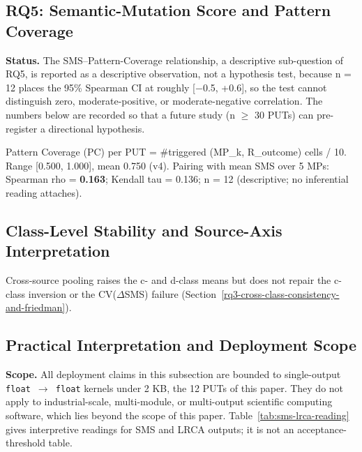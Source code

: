 \documentclass[manuscript,screen,review]{acmart}
\begin{document}
\subsection{RQ5: Semantic-Mutation Score and Pattern Coverage}\label{rq4-sms-vs-pattern-coverage}

\textbf{Status.} The SMS--Pattern-Coverage relationship, a descriptive
sub-question of RQ5, is reported as a descriptive observation, not a
hypothesis test, because n = 12 places the 95\% Spearman CI at roughly
{[}$-$0.5, +0.6{]}, so the test cannot distinguish zero,
moderate-positive, or moderate-negative correlation. The numbers below
are recorded so that a future study (n $\geq$ 30 PUTs) can pre-register a directional
hypothesis.

Pattern Coverage (PC) per PUT = \#triggered (MP\_k, R\_outcome) cells /
10. Range {[}0.500, 1.000{]}, mean 0.750 (v4). Pairing with mean SMS over 5
MPs: Spearman rho = \textbf{0.163}; Kendall tau = 0.136; n = 12
(descriptive; no inferential reading attaches).

\subsection{Class-Level Stability and Source-Axis Interpretation}\label{h4-partial-across-same-source-and-cross-source}

Cross-source pooling raises the c- and d-class means but does not repair
the c-class inversion or the CV($\Delta$SMS) failure
(Section~\ref{rq3-cross-class-consistency-and-friedman}).

\subsection{Practical Interpretation and Deployment Scope}\label{stakeholder-analysis-single-output-kernels-scope}

\textbf{Scope.} All deployment claims in this subsection are bounded to
single-output \texttt{float\ $\to$\ float} kernels under 2 KB, the 12 PUTs
of this paper. They do not apply to industrial-scale, multi-module, or
multi-output scientific computing software, which lies beyond the scope of this paper.
Table~\ref{tab:sms-lrca-reading} gives interpretive readings for SMS and
LRCA outputs; it is not an acceptance-threshold table.
\end{document}
